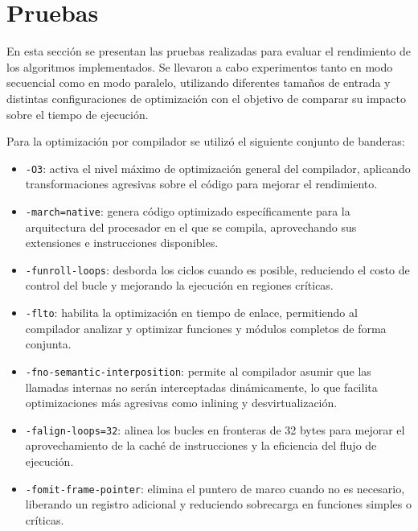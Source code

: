 \section{Pruebas}
\label{pruebas}

En esta sección se presentan las pruebas realizadas para evaluar el rendimiento de los algoritmos implementados. Se llevaron a cabo experimentos tanto en modo secuencial como en modo paralelo, utilizando diferentes tamaños de entrada y distintas configuraciones de optimización con el objetivo de comparar su impacto sobre el tiempo de ejecución.

Para la optimización por compilador se utilizó el siguiente conjunto de banderas:

\begin{itemize}
    \item \texttt{-O3}: activa el nivel máximo de optimización general del compilador, aplicando transformaciones agresivas sobre el código para mejorar el rendimiento.
    \item \texttt{-march=native}: genera código optimizado específicamente para la arquitectura del procesador en el que se compila, aprovechando sus extensiones e instrucciones disponibles.
    \item \texttt{-funroll-loops}: desborda los ciclos cuando es posible, reduciendo el costo de control del bucle y mejorando la ejecución en regiones críticas.
    \item \texttt{-flto}: habilita la optimización en tiempo de enlace, permitiendo al compilador analizar y optimizar funciones y módulos completos de forma conjunta.
    \item \texttt{-fno-semantic-interposition}: permite al compilador asumir que las llamadas internas no serán interceptadas dinámicamente, lo que facilita optimizaciones más agresivas como inlining y desvirtualización.
    \item \texttt{-falign-loops=32}: alinea los bucles en fronteras de 32 bytes para mejorar el aprovechamiento de la caché de instrucciones y la eficiencia del flujo de ejecución.
    \item \texttt{-fomit-frame-pointer}: elimina el puntero de marco cuando no es necesario, liberando un registro adicional y reduciendo sobrecarga en funciones simples o críticas.
\end{itemize}








